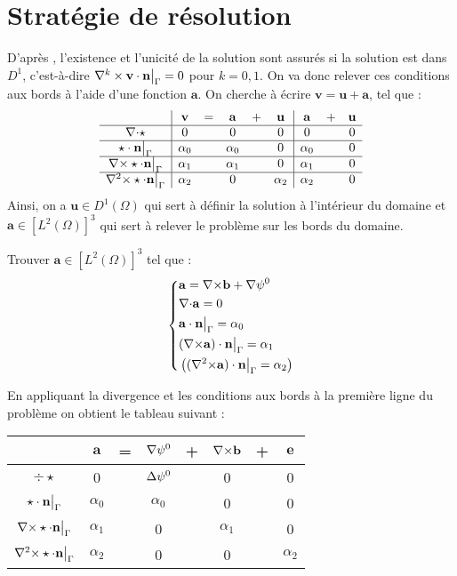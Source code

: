 \chapter{Stratégie de résolution}
\label{strat}
D'après \cite{Penel2004}, l'existence et l'unicité de la solution sont assurés si la solution est dans $D^1$, c'est-à-dire $\nabla^k\times\mathbf{v}\cdot\mathbf{n}{\big\rvert_{\Gamma}}=0$ pour $k=0,1$. On va donc relever ces conditions aux bords à l'aide d'une fonction $\mathbf{a}$. On cherche à écrire  $\mathbf{v}=\mathbf{u}+\mathbf{a}$, tel que :\\
\begin{equation}\label{v}
\begin{array}{c|ccccc|ccc}
& \mathbf{v} & = & \mathbf{a} & + & \mathbf{u} & \mathbf{a} & + & \mathbf{u}\\ \hline
{\nabla\cdot}\star & 0 & & 0 & & 0 & 0 & & 0\\ \hline
\star\cdot \mathbf{n}{\big\rvert_{\Gamma}} & \alpha_0 & & \alpha_0 & & 0 & \alpha_0 & & 0\\ \hline
{\nabla\times}\star\cdot \mathbf{n}{\big\rvert_{\Gamma}} & \alpha_1 & & \alpha_1 & & 0 & \alpha_1 & & 0\\ \hline
{\nabla^2\times}\star\cdot \mathbf{n}{\big\rvert_{\Gamma}} & \alpha_2 & & 0 & & \alpha_2 & \alpha_2 & & 0
\end{array}
\end{equation}
Ainsi, on a $\mathbf{u}\in D^1(\Omega)$ qui sert à définir la solution à l'intérieur du domaine et $\mathbf{a}\in [L^2(\Omega)]^3$ qui sert à relever le problème sur les bords du domaine.
\begin{pb}\label{a}
Trouver $\mathbf{a}\in [L^2(\Omega)]^3$ tel que :
\begin{equation*}
\left\{\begin{aligned}
&\mathbf{a}={\nabla\times} \mathbf{b}+{\nabla}\psi^0\\
&{\nabla\cdot} \mathbf{a} =0\\
&\mathbf{a}\cdot \mathbf{n}{\big\rvert_{\Gamma}} = \alpha_0\\
&({\nabla\times} \mathbf{a})\cdot \mathbf{n}{\big\rvert_{\Gamma}} = \alpha_1\\
&\left( ({\nabla^2\times}\mathbf{a})\cdot\mathbf{n}{\big\rvert_{\Gamma}} = \alpha_2 \right)
\end{aligned}\right.
\end{equation*}
\end{pb}
En appliquant la divergence et les conditions aux bords à la première ligne du problème on obtient le tableau suivant :
\begin{center}
\begin{tabular}{c|ccccccc}
& $\mathbf{a}$ & = & ${\nabla}\psi^0$ & + & ${\nabla\times} \mathbf{b}$ & + & $\mathbf{e}$ \\ \hline
$\div\star$ & 0 & & ${\Delta}\psi^0$ & & 0 & & 0\\ \hline
$\star\cdot \mathbf{n}{\big\rvert_{\Gamma}}$ & $\alpha_0$ & & $\alpha_0$ & & 0 & & 0\\ \hline
  ${\nabla\times}\star\cdot \mathbf{n}{\big\rvert_{\Gamma}}$ & $\alpha_1$ & & 0 & & $\alpha_1$ & & 0\\ \hline
  ${\nabla^2\times}\star\cdot\mathbf{n}{\big\rvert_{\Gamma}}$ & $\alpha_2$ & & 0 & & 0 & & $\alpha_2$
\end{tabular}
\end{center}
